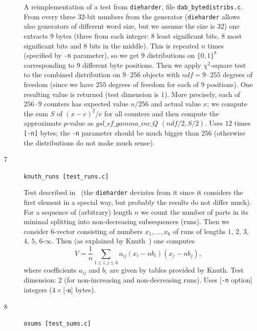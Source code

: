 \documentclass[12pt,a4paper,fullpage]{article}
\begin{document}
\begin{description}
A reimplementation of a test from \texttt{dieharder}, file \texttt{dab\_bytedistribs.c}. From every three $32$-bit numbers from the generator (\texttt{dieharder} allows also generators of different word size, but we assume the size is $32$) one extracts $9$ bytes (three from each integer: $8$ least significant bits, $8$ most significant bits and $8$ bits in the middle). This is repeated $n$ times (specified by \texttt{-n} parameter), so we get $9$ distributions on $\{0,1\}^8$ corresponding to $9$ different byte positions. Then we apply $\chi^2$-square test to the combined distribution on $9\cdot256$ objects with $\textit{ndf}=9\cdot 255$ degrees of freedom (since we have $255$ degrees of freedom for each of $9$ positions). One resulting value is returned (test dimension is $1$). More precisely, each of $256\cdot 9$ counters has expected value $n/256$ and actual value $x$; we compute the sum $S$ of $(x-e)^2/e$ for all counters and then compute the approximate $p$-value as $\textit{gsl\_sf\_gamma\_inc\_Q}\,\,(\textit{ndf}/2, S/2)$. Uses $12$ times \texttt{[-n]} bytes; the \texttt{-n} parameter should be much bigger than $256$ (otherwise the distributions do not make much sense).
     
\item[7] \texttt{knuth\_runs [test\_runs.c]}

Test described in~\cite[p.~65]{knuth2} (the \texttt{dieharder} deviates from it since it considers the first element in a special way, but probably the results do not differ much).  For a sequence of (arbitrary) length $n$ we count the number of parts in its minimal splitting into non-decreasing subsequences (runs). Then we consider $6$-vector consisting of numbers $x_1,\ldots,x_6$ of runs of lengths $1$, $2$, $3$, $4$, $5$, $6$-$\infty$. Then (as explained by Knuth~\cite{knuth2}) one computes
\[
 V=\frac{1}{n}\sum_{1\le i,j\le 6} a_{ij}(x_i-nb_i)(x_j-nb_j),
\]
where coefficients $a_{ij}$ and $b_{i}$ are given by tables provided by Knuth. Test dimension: $2$ (for non-increasing and non-decreasing runs). Uses [\texttt{-n} option] integers ($4\times\texttt{[-n]}$ bytes).

\item[8] \texttt{osums [test\_sums.c]}


\end{description}
\end{document}

